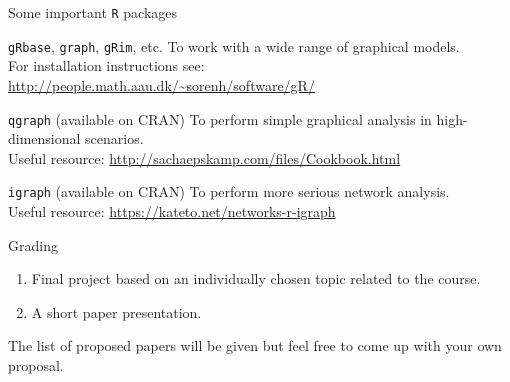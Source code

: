 \documentclass[dvipsnames,aspectratio=169]{beamer} %
\begin{document}
\begin{frame}{Some important \texttt{R} packages}
\begin{alertblock}{\texttt{gRbase}, \texttt{graph}, \texttt{gRim}, etc.}
To work with a wide range of graphical models.\\[.3cm]
	For installation instructions see: 	\url{http://people.math.aau.dk/~sorenh/software/gR/}
\end{alertblock}
\begin{alertblock}{\texttt{qgraph} (available on CRAN)}
To perform simple graphical analysis in high-dimensional scenarios.\\[.3cm]
	Useful resource: \textcolor{blue}{\url{http://sachaepskamp.com/files/Cookbook.html}}
\end{alertblock}
\begin{alertblock}{\texttt{igraph} (available on CRAN)}
To perform more serious network analysis.\\[.3cm]
	Useful resource: \textcolor{blue}{\url{https://kateto.net/networks-r-igraph}}
\end{alertblock}
\end{frame}

\begin{frame}{Grading}

\begin{enumerate}
	\item [75\%] Final project based on an individually chosen topic related to the course.\\[.4cm]
	\item [25\%] A short paper presentation. 
\end{enumerate}

\bigskip

The list of proposed papers will be given but feel free to come up with your own proposal.
	
\end{frame}
\end{document}
